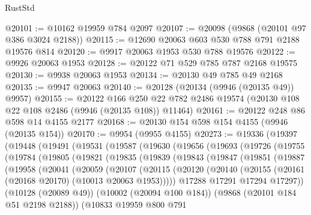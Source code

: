 \begin{lexlean}{RustStd}
\begin{coremodule}
@20101 := @10162 @19959 @784 @2097
@20107 := @20098 (@9868 (@20101 @97 @386 @3024 @2188))
@20115 := @12690 @20063 @603 @530 @788 @791 @2188 @19576 @814
@20120 := @9917 @20063 @1953 @530 @788 @19576
@20122 := @9926 @20063 @1953
@20128 := @20122 @71 @529 @785 @787 @2168 @19575
@20130 := @9938 @20063 @1953
@20134 := @20130 @49 @785 @49 @2168
@20135 := @9947 @20063
@20140 := @20128 (@20134 (@9946 (@20135 @49)) @9957)
@20155 := @20122
    @166
    @250
    @22
    @782
    @2486
    @19574
    (@20130 @108 @22 @108 @2486 (@9946 (@20135 @108)) @11464)
@20161 := @20122 @248 @86 @598 @14 @4155 @2177
@20168 := @20130 @154 @598 @154 @4155 (@9946 (@20135 @154))
@20170 := @9954 (@9955 @4155)
@20273 := @19336
    (@19397
      (@19448
        (@19491
          (@19531
            (@19587
              (@19630
                (@19656
                  (@19693
                    (@19726
                      (@19755
                        (@19784
                          (@19805
                            (@19821
                              (@19835
                                (@19839
                                  (@19843
                                    (@19847
                                      (@19851
                                        (@19887
                                          (@19958
                                            (@20041
                                              (@20059
                                                (@20107
                                                  (@20115
                                                    (@20120
                                                      (@20140
                                                        (@20155
                                                          (@20161
                                                            (@20168 @20170)
                                                            (@10013 @20063 @1953)))))
                                                    @17288
                                                    @17291
                                                    @17294
                                                    @17297))
                                                (@10128 (@20089 @49))
                                                (@10002 (@20094 @100 @184))
                                                (@9868 (@20101 @184 @51 @2198 @2188))
                                                (@10833
                                                  @19959
                                                  @800
                                                  @791

\end{coremodule}
\end{lexlean}
